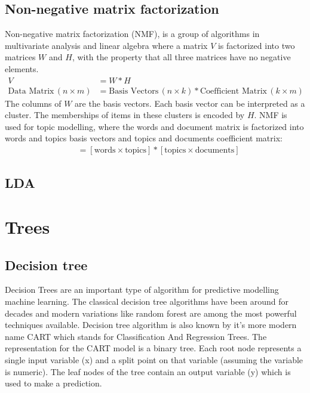 \documentclass{book}
\begin{document}
\section{Non-negative matrix factorization}
Non-negative matrix factorization (NMF), is a group of algorithms in multivariate analysis and linear algebra where a matrix $V$ is factorized into two matrices $W$ and $H$, with the property that all three matrices have no negative elements. 
\begin{align*}
V &= W * H \\
\mbox{Data Matrix} \, (n \times m) &= \mbox{Basis Vectors} \, (n \times k) * \mbox{Coefficient Matrix} \, (k \times m)  
\end{align*}
The columns of $W$ are the basis vectors. Each basis vector can be interpreted as a cluster. The memberships of items in these clusters is encoded by $H$.
NMF is used for topic modelling, where the words and document matrix is factorized into words and topics basis vectors and topics and documents coefficient matrix:
\begin{align*}
[\mbox{words} \times \mbox{documents}] &= 
[\mbox{words} \times \mbox{topics}] * 
[\mbox{topics} \times \mbox{documents}]
\end{align*}

\section{LDA}

\chapter{Trees}

\section{Decision tree}
Decision Trees are an important type of algorithm for predictive modelling machine learning.
The classical decision tree algorithms have been around for decades and modern variations like random forest are among the most powerful techniques available.
Decision tree algorithm is also known by it's more modern name CART which stands for Classification And Regression Trees. The representation for the CART model is a binary tree. Each root node represents a single input variable (x) and a split point on that variable (assuming the variable is numeric). The leaf nodes of the tree contain an output variable (y) which is used to make a prediction.
\end{document}
